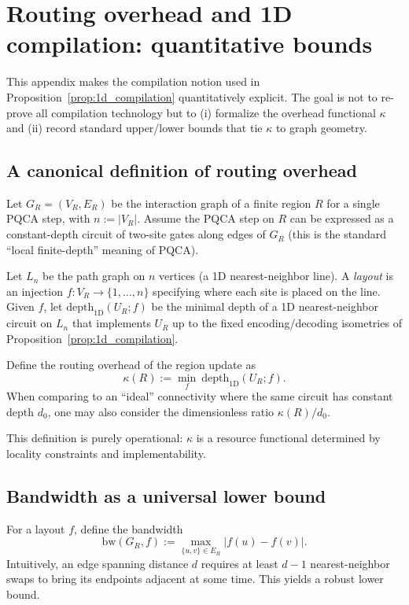 \section{Routing overhead and 1D compilation: quantitative bounds}
\label{app:compilation_overhead}

This appendix makes the compilation notion used in Proposition~\ref{prop:1d_compilation} quantitatively explicit.
The goal is not to re-prove all compilation technology but to (i) formalize the overhead functional $\kappa$ and (ii) record standard upper/lower bounds that tie $\kappa$ to graph geometry.

\subsection{A canonical definition of routing overhead}
Let $G_R=(V_R,E_R)$ be the interaction graph of a finite region $R$ for a single PQCA step, with $n:=|V_R|$.
Assume the PQCA step on $R$ can be expressed as a constant-depth circuit of two-site gates along edges of $G_R$ (this is the standard ``local finite-depth'' meaning of PQCA).

Let $L_n$ be the path graph on $n$ vertices (a 1D nearest-neighbor line).
A \emph{layout} is an injection $f:V_R\to\{1,\dots,n\}$ specifying where each site is placed on the line.
Given $f$, let $\mathrm{depth}_{\mathrm{1D}}(U_R;f)$ be the minimal depth of a 1D nearest-neighbor circuit on $L_n$ that implements $U_R$ up to the fixed encoding/decoding isometries of Proposition~\ref{prop:1d_compilation}.

\begin{definition}
\label{def:routing_overhead}
Define the routing overhead of the region update as
\begin{equation}
\kappa(R):=\min_f\ \mathrm{depth}_{\mathrm{1D}}(U_R;f).
\end{equation}
When comparing to an ``ideal'' connectivity where the same circuit has constant depth $d_0$, one may also consider the dimensionless ratio $\kappa(R)/d_0$.
\end{definition}

This definition is purely operational: $\kappa$ is a resource functional determined by locality constraints and implementability.

\subsection{Bandwidth as a universal lower bound}
For a layout $f$, define the bandwidth
\begin{equation}
\mathrm{bw}(G_R,f):=\max_{\{u,v\}\in E_R} |f(u)-f(v)|.
\end{equation}
Intuitively, an edge spanning distance $d$ requires at least $d-1$ nearest-neighbor swaps to bring its endpoints adjacent at some time.
This yields a robust lower bound.

